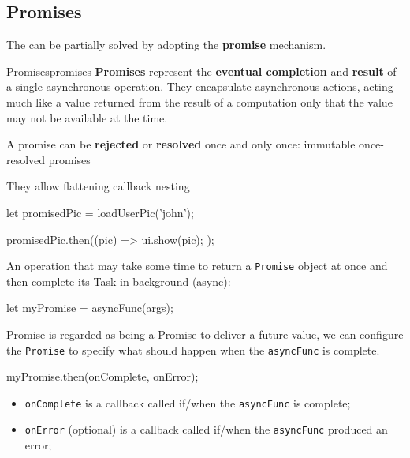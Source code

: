 \subsection{Promises}\label{sub:rs_promises} %
The  can be partially solved by adopting the \textbf{promise} mechanism.
\begin{definition}{Promises}{promises}
    \textbf{Promises} represent the \textbf{eventual completion} and \textbf{result} of a single asynchronous operation.
    They encapsulate asynchronous actions, acting much like a value returned from the result of a computation only that the value may not be available at the time.
    \begin{warning}
        A promise can be \textbf{rejected} or \textbf{resolved} once and only once: immutable once-resolved promises
    \end{warning}
    \begin{note}
        They allow flattening callback nesting
    \end{note}
\end{definition}
\begin{example}{}{}
    \begin{codeblock}[js]{}
    let promisedPic = loadUserPic('john');

    promisedPic.then((pic) => {
        ui.show(pic);
    });
    \end{codeblock}
\end{example}
An operation that may take some time to return a \texttt{Promise} object at once and then complete its \hyperref[def:task]{Task} in background (async):
\begin{codeblock}[js]{}
    let myPromise = asyncFunc(args);
\end{codeblock}
Promise is regarded as being a Promise to deliver a future value, we can configure the \texttt{Promise} to specify what should happen when the \texttt{asyncFunc} is complete.
\begin{codeblock}[js]{}
    myPromise.then(onComplete, onError);
\end{codeblock}
\begin{itemize}
    \item \texttt{onComplete} is a callback called if/when the \texttt{asyncFunc} is complete;
    \item \texttt{onError} (optional) is a callback called if/when the \texttt{asyncFunc} produced an error;
\end{itemize}
%
